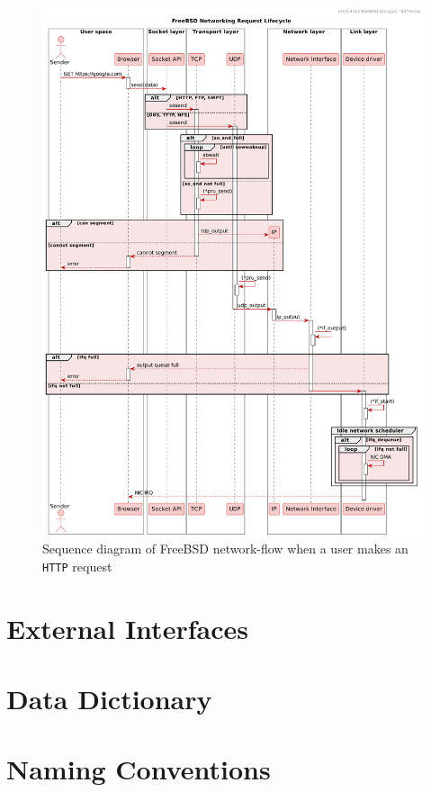 \documentclass[12pt, dvipsnames, a4paper]{article}
\newcommand{\code}[1]{\texttt{#1}}
\begin{document}
\begin{figure}[!htb]
	\advance\leftskip-0.5cm
	\includegraphics[width = 570pt]{assets/sequence_diagrams/network-send-flow.pdf}
	\caption{Sequence diagram of FreeBSD network-flow when a user makes an \code{HTTP} request}
\end{figure}
\clearpage

\section{External Interfaces}
\lipsum[1]

\section{Data Dictionary}
\lipsum[1]

\section{Naming Conventions}
\lipsum[1]
\end{document}
